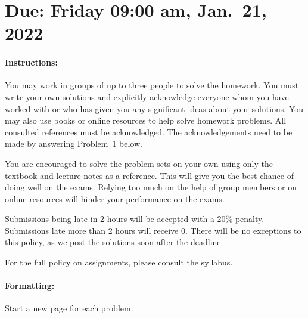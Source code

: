 \documentclass[11pt]{article}
\begin{document}
\maketitle

\section*{Due: Friday 09:00 am, Jan.\ 21, 2022}

\paragraph*{Instructions:}

You may work in groups of up to three people to solve the homework.
You must write your own solutions and explicitly acknowledge everyone whom 
you have worked with or who has given you any significant ideas about your solutions. 
You may also use books or online resources to help solve homework problems.  
All consulted references must be acknowledged. The acknowledgements need to be made by answering Problem~1 below.

You are encouraged to solve the problem sets on your own using only the textbook and lecture notes as a reference. This will give you the best chance of doing well on the exams. Relying too much on the help of group members or on online resources will hinder your performance on the exams.

Submissions being late in 2 hours will be accepted with a 20\% penalty. Submissions late more than 2 hours will receive 0. There will be no exceptions to this policy, as we post the solutions soon after the deadline. 

For the full policy on assignments, please consult the syllabus.

\paragraph*{Formatting:} Start a new page for each problem.
\end{document}
